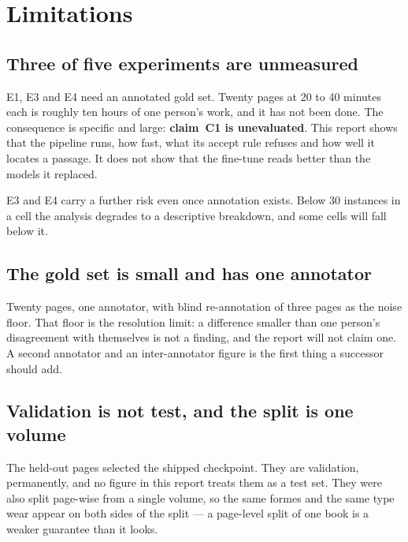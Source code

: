 \section{Limitations}
\label{sec:limitations}

\subsection{Three of five experiments are unmeasured}

E1, E3 and E4 need an annotated gold set. Twenty pages at 20 to 40 minutes each
is roughly ten hours of one person's work, and it has not been done. The
consequence is specific and large: \textbf{claim~C1 is unevaluated}. This
report shows that the pipeline runs, how fast, what its accept rule refuses and
how well it locates a passage. It does not show that the fine-tune reads better
than the models it replaced.

E3 and E4 carry a further risk even once annotation exists. Below 30 instances
in a cell the analysis degrades to a descriptive breakdown, and some cells will
fall below it.

\subsection{The gold set is small and has one annotator}

Twenty pages, one annotator, with blind re-annotation of three pages as the
noise floor. That floor is the resolution limit: a difference smaller than one
person's disagreement with themselves is not a finding, and the report will not
claim one. A second annotator and an inter-annotator figure is the first thing
a successor should add.

\subsection{Validation is not test, and the split is one volume}

The \trainPagesVal{} held-out pages selected the shipped checkpoint. They are
validation, permanently, and no figure in this report treats them as a test
set. They were also split page-wise from a single volume, so the same formes
and the same type wear appear on both sides of the split --- a page-level split
of one book is a weaker guarantee than it looks.

